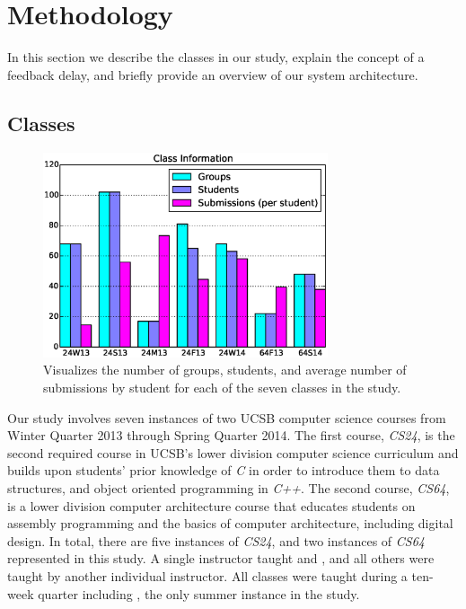 \section{Methodology} 

In this section we describe the classes in our study, explain the concept of a
feedback delay, and briefly provide an overview of our system architecture.

\subsection{Classes}

\begin{figure}[!t]
\centering \includegraphics[width=3.3in]{graphs/Class_Information.eps}
\caption{Visualizes the number of groups, students, and average number of
  submissions by student for each of the seven classes in the study.}
\end{figure}

Our study involves seven instances of two UCSB computer science courses from
Winter Quarter 2013 through Spring Quarter 2014. The first course, \emph{CS24},
is the second required course in UCSB's lower division computer science
curriculum and builds upon students' prior knowledge of \emph{C} in order to
introduce them to data structures, and object oriented programming in
\emph{C++}. The second course, \emph{CS64}, is a lower division computer
architecture course that educates students on assembly programming and the
basics of computer architecture, including digital design. In total, there are
five instances of \emph{CS24}, and two instances of \emph{CS64} represented in
this study. A single instructor taught  and , and all
others were taught by another individual instructor. All classes were taught
during a ten-week quarter including , the only summer instance in
the study.

